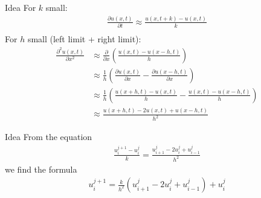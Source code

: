 \documentclass[11pt]{beamer}
\begin{document}
\begin{frame}{Idea}
	For $k$ small:
	\begin{align*}
		\frac{\partial u(x,t)}{\partial t} \approx \frac{u(x,t+k)-u(x,t)}{k}\\
	\end{align*}
	For $h$ small (left limit + right limit):
	\begin{align*}
		\frac{\partial^2 u(x,t)}{\partial x^2} &\approx
			\frac{\partial}{\partial x}\left(
				\frac{u(x,t) - u(x-h,t)}{h}
			\right)\\
		&\approx \frac1h\left(
			\frac{\partial u(x,t)}{\partial x} -
			\frac{\partial u(x-h,t)}{\partial x}
		\right)\\
		&\approx \frac1h\left(
			\frac{u(x+h,t) - u(x,t)}{h} - \frac{u(x,t)-u(x-h,t)}{h}
		\right)\\
		&\approx \frac{u(x+h,t)-2u(x,t)+u(x-h,t)}{h^2}
	\end{align*}
\end{frame}

\begin{frame}{Idea}
	From the equation
	\begin{align*}
		\frac{u_i^{j+1}-u_i^j}{k}= \frac{u_{i+1}^j-2u_{i}^j+u_{i-1}^j}{h^2}
	\end{align*}
	we find the formula
	\begin{align*}
		u_i^{j+1} = \frac{k}{h^2}\left(u_{i+1}^j - 2u_i^j + u_{i-1}^j\right)
			 + u_i^j
	\end{align*}
\end{frame}
\end{document}
